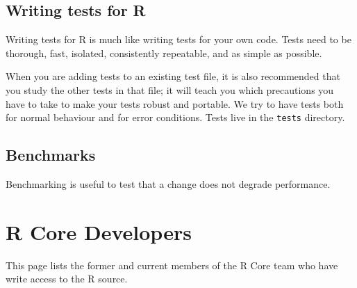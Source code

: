 \documentclass[
]{book}
\begin{document}
\hypertarget{writing-tests-for-r}{%
\section{Writing tests for R}\label{writing-tests-for-r}}

Writing tests for R is much like writing tests for your own code. Tests need to be thorough, fast, isolated, consistently repeatable, and as simple as possible.

When you are adding tests to an existing test file, it is also recommended that you study the other tests in that file; it will teach you which precautions you have to take to make your tests robust and portable. We try to have tests both for normal behaviour and for error conditions. Tests live in the \texttt{tests} directory.

\hypertarget{benchmarks}{%
\section{Benchmarks}\label{benchmarks}}

Benchmarking is useful to test that a change does not degrade performance.

\hypertarget{CoreDev}{%
\chapter{R Core Developers}\label{CoreDev}}

This page lists the former and current members of the R Core team who have write access to the R source.
\end{document}
